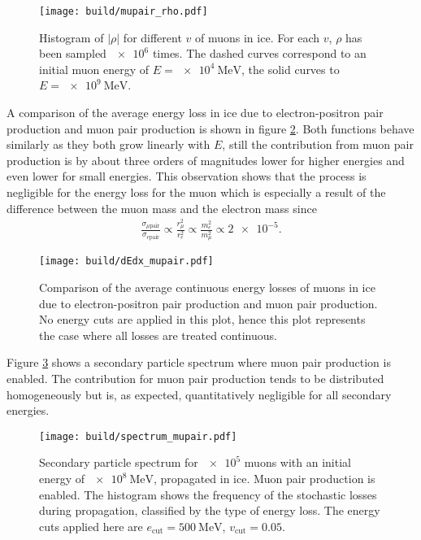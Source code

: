 \begin{figure}
    \centering
    \texttt{[image: build/mupair\_rho.pdf]}
    \caption{Histogram of $\lvert\rho\rvert$ for different $v$ of muons in ice. For each $v$, $\rho$ has been sampled $\num{e6}$ times. The dashed curves correspond to an initial muon energy of $E=\SI{e4}{\mega\electronvolt}$, the solid curves to $E = \SI{e9}{\mega\electronvolt}$.}
    \label{fig:rho_mupair}
\end{figure}

A comparison of the average energy loss in ice due to electron-positron pair production and muon pair production is shown in figure \ref{fig:dEdx_mupair}.
Both functions behave similarly as they both grow linearly with $E$, still the contribution from muon pair production is by about three orders of magnitudes lower for higher energies and even lower for small energies.
This observation shows that the process is negligible for the energy loss for the muon which is especially a result of the difference between the muon mass and the electron mass since 
\begin{align*}
	\frac{\sigma_{\mu \text{pair}}}{\sigma_{e \text{pair}}} \propto \frac{r_{\mu}^2}{r_e^2} \propto \frac{m_e^2}{m_{\mu}^2} \propto \num{2e-5}.
\end{align*}

\begin{figure}
    \centering
    \texttt{[image: build/dEdx\_mupair.pdf]}
    \caption{Comparison of the average continuous energy losses of muons in ice due to electron-positron pair production and muon pair production. No energy cuts are applied in this plot, hence this plot represents the case where all losses are treated continuous.}
    \label{fig:dEdx_mupair}
\end{figure}

Figure \ref{fig:spectrum_mupair} shows a secondary particle spectrum where muon pair production is enabled.
The contribution for muon pair production tends to be distributed homogeneously but is, as expected, quantitatively negligible for all secondary energies.

\begin{figure}
    \centering
    \texttt{[image: build/spectrum\_mupair.pdf]}
    \caption{Secondary particle spectrum for $\num{e5}$ muons with an initial energy of $\SI{e8}{\mega\electronvolt}$, propagated in ice. Muon pair production is enabled. The histogram shows the frequency of the stochastic losses during propagation, classified by the type of energy loss. The energy cuts applied here are $e_\text{cut} = \SI{500}{\mega\electronvolt}$, $v_\text{cut} = 0.05$.}
    \label{fig:spectrum_mupair}
\end{figure}


